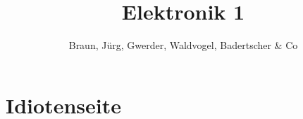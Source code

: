 \documentclass[10pt,twoside,a4paper,fleqn]{article}
\title{Elektronik 1}
\author{Braun, Jürg, Gwerder, Waldvogel, Badertscher \& Co}
\begin{document}
%









\newpage
\section{Idiotenseite}

\end{document}
